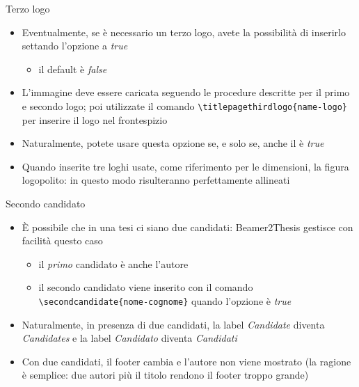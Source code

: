 \begin{frame}[fragile]{Terzo logo}
\begin{itemize}
\item Eventualmente, se è necessario un terzo logo, avete la possibilità di inserirlo settando l'opzione  a \emph{true}
\begin{itemize}
\item il default è \emph{false}
\end{itemize}
\item L'immagine deve essere caricata seguendo le procedure descritte per il primo e secondo logo; poi utilizzate il comando \verb!\titlepagethirdlogo{name-logo}! per inserire il logo nel frontespizio
\item Naturalmente, potete usare questa opzione se, e solo se, anche il  è \emph{true}
\item Quando inserite tre loghi usate, come riferimento per le dimensioni, la figura \alert{logopolito}: in questo modo risulteranno perfettamente allineati
\end{itemize}
\end{frame}
\begin{frame}[t,fragile]{Secondo candidato}
\begin{itemize}
\item \`{E} possibile che in una tesi ci siano due candidati: Beamer2Thesis gestisce con facilità questo caso
\begin{itemize}
\item il \emph{primo} candidato è anche l'autore
\item il secondo candidato viene inserito con il comando \verb!\secondcandidate{nome-cognome}! quando l'opzione  è \emph{true}
\end{itemize}
\item Naturalmente, in presenza di due candidati, la label \emph{Candidate} diventa \emph{Candidates} e la label \emph{Candidato} diventa \emph{Candidati}
\item Con due candidati, il footer cambia e l'autore non viene mostrato (la ragione è semplice: due autori più il titolo rendono il footer troppo grande)
\end{itemize}
\end{frame}

